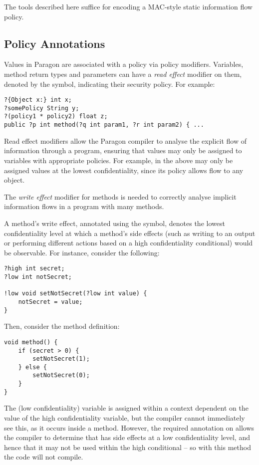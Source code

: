 The tools described here suffice for encoding a MAC-style static information flow policy.

\subsection{Policy Annotations}

Values in Paragon are associated with a policy via policy modifiers. Variables, method return types and parameters can have a \textit{read effect} modifier on them, denoted by the  symbol, indicating their security policy. For example:

\begin{verbatim}
?{Object x:} int x;
?somePolicy String y;
?(policy1 * policy2) float z;
public ?p int method(?q int param1, ?r int param2) { ...
\end{verbatim}

Read effect modifiers allow the Paragon compiler to analyse the explicit flow of information through a program, ensuring that values may only be assigned to variables with appropriate policies. For example, in the above  may only be assigned values at the lowest confidentiality, since its policy allows flow to any object. 

The \textit{write effect} modifier for methods is needed to correctly analyse implicit information flows in a program with many methods.

A method's write effect, annotated using the \code{!} symbol, denotes the lowest confidentiality level at which a method's side effects (such as writing to an output or performing different actions based on a high confidentiality conditional) would be observable. For instance, consider the following:

\begin{verbatim}
?high int secret;
?low int notSecret;

!low void setNotSecret(?low int value) {
	notSecret = value;
}
\end{verbatim}

Then, consider the method definition:

\begin{verbatim}
void method() {
	if (secret > 0) {
		setNotSecret(1);
	} else {
		setNotSecret(0);
	}
}
\end{verbatim}

The (low confidentiality)  variable is assigned within a context dependent on the value of the high confidentiality  variable, but the compiler cannot immediately see this, as it occurs inside a method. However, the required  annotation on  allows the compiler to determine that  has side effects at a low confidentiality level, and hence that it may not be used within the high conditional -- so with this method the code will not compile.

